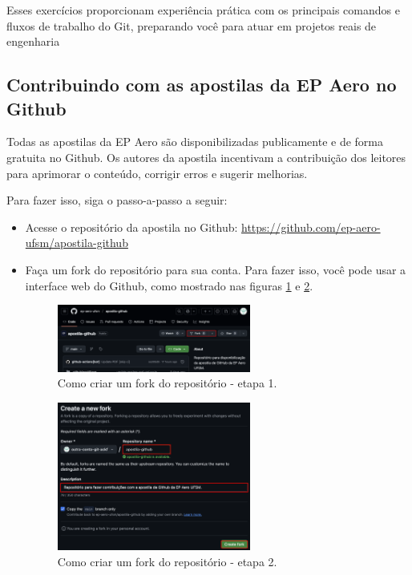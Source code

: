 Esses exercícios proporcionam experiência prática com os principais comandos e fluxos de trabalho do Git, preparando você para atuar em projetos reais de engenharia

\subsection{Contribuindo com as apostilas da EP Aero no Github}

Todas as apostilas da EP Aero são disponibilizadas publicamente e de forma gratuita no Github. Os autores da apostila incentivam a contribuição dos leitores para aprimorar o conteúdo, corrigir erros e sugerir melhorias.

Para fazer isso, siga o passo-a-passo a seguir:

\begin{itemize}
        \item Acesse o repositório da apostila no Github: \url{https://github.com/ep-aero-ufsm/apostila-github}
        \item Faça um fork do repositório para sua conta. Para fazer isso, você pode usar a interface web do Github, como mostrado nas figuras \ref{fig:1_fork} e \ref{fig:2_fork}.
\begin{figure}[H]
        \centering
        \includegraphics[width=0.6\textwidth]{imgs/tutorial_contribuicao/1_fork.png}
        \caption{Como criar um fork do repositório - etapa 1.}
        \label{fig:1_fork}
    \end{figure}

    \begin{figure}[H]
        \centering
        \includegraphics[width=0.6\textwidth]{imgs/tutorial_contribuicao/2_fork.png}
        \caption{Como criar um fork do repositório - etapa 2.}
        \label{fig:2_fork}
    \end{figure}


\end{itemize}
